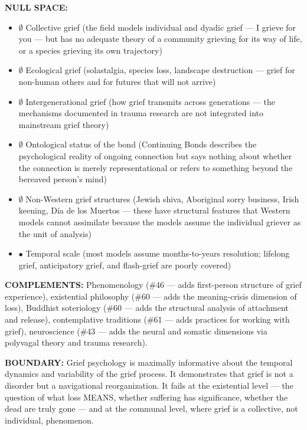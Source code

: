 \textbf{NULL SPACE:}

\begin{itemize}[nosep,leftmargin=*]
  \item $\emptyset$ Collective grief (the field models individual and dyadic grief — I grieve for you — but has no adequate theory of a community grieving for its way of life, or a species grieving its own trajectory)
  \item $\emptyset$ Ecological grief (solastalgia, species loss, landscape destruction — grief for non-human others and for futures that will not arrive)
  \item $\emptyset$ Intergenerational grief (how grief transmits across generations — the mechanisms documented in trauma research are not integrated into mainstream grief theory)
  \item $\emptyset$ Ontological status of the bond (Continuing Bonds describes the psychological reality of ongoing connection but says nothing about whether the connection is merely representational or refers to something beyond the bereaved person's mind)
  \item $\emptyset$ Non-Western grief structures (Jewish shiva, Aboriginal sorry business, Irish keening, Día de los Muertos — these have structural features that Western models cannot assimilate because the models assume the individual griever as the unit of analysis)
  \item $\bullet$ Temporal scale (most models assume months-to-years resolution; lifelong grief, anticipatory grief, and flash-grief are poorly covered)
\end{itemize}


\textbf{COMPLEMENTS:} Phenomenology (\#46 — adds first-person structure of grief experience), existential philosophy (\#60 — adds the meaning-crisis dimension of loss), Buddhist soteriology (\#60 — adds the structural analysis of attachment and release), contemplative traditions (\#61 — adds practices for working with grief), neuroscience (\#43 — adds the neural and somatic dimensions via polyvagal theory and trauma research).


\textbf{BOUNDARY:} Grief psychology is maximally informative about the temporal dynamics and variability of the grief process. It demonstrates that grief is not a disorder but a navigational reorganization. It fails at the existential level — the question of what loss MEANS, whether suffering has significance, whether the dead are truly gone — and at the communal level, where grief is a collective, not individual, phenomenon.


